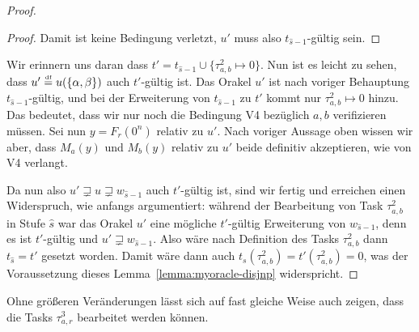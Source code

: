 \begin{proof}
\begin{proof}
    Damit ist keine Bedingung verletzt, $u'$ muss also $t_{\hat{s}-1}$-gültig sein.
\end{proof}
Wir erinnern uns daran dass $t'=t_{\hat{s}-1}\cup \{\tau^2_{a,b}\mapsto 0\}$.
Nun ist es leicht zu sehen, dass $u'\stackrel{\text{\smash{\tiny df}}}{=} u(\{\alpha,\beta\})$ auch $t'$-gültig ist. Das Orakel $u'$ ist nach voriger Behauptung $t_{\hat{s}-1}$-gültig, und bei der Erweiterung von $t_{\hat{s}-1}$ zu $t'$ kommt nur $\tau^2_{a,b}\mapsto 0$ hinzu. Das bedeutet, dass wir nur noch die Bedingung V4 bezüglich $a,b$ verifizieren müssen.
Sei nun $y=F_r(0^n)$ relativ zu $u'$.
Nach voriger Aussage oben wissen wir aber, dass $M_a(y)$ und $M_b(y)$ relativ zu $u'$ beide definitiv akzeptieren, wie von V4 verlangt.

Da nun also $u'\sqsupsetneq u \sqsupsetneq w_{\hat{s}-1}$ auch $t'$-gültig ist, sind wir fertig und erreichen einen Widerspruch, wie anfangs argumentiert: während der Bearbeitung von Task $\tau^2_{a,b}$ in Stufe $\hat{s}$ war das Orakel $u'$ eine mögliche $t'$-gültig Erweiterung von $w_{\hat{s}-1}$, denn es ist $t'$-gültig und $u'\sqsupsetneq w_{\hat{s}-1}$. Also wäre nach Definition des Tasks $\tau^2_{a,b}$ dann $t_{\hat{s}}=t'$ gesetzt worden.
Damit wäre dann auch $t_{s}(\tau^2_{a,b})=t'(\tau^2_{a,b})=0$, was der Voraussetzung dieses Lemma~\ref{lemma:myoracle-disjnp} widerspricht.
\end{proof}

Ohne größeren Veränderungen lässt sich auf fast gleiche Weise auch zeigen, dass die Tasks $\tau^3_{a,r}$ bearbeitet werden können.

